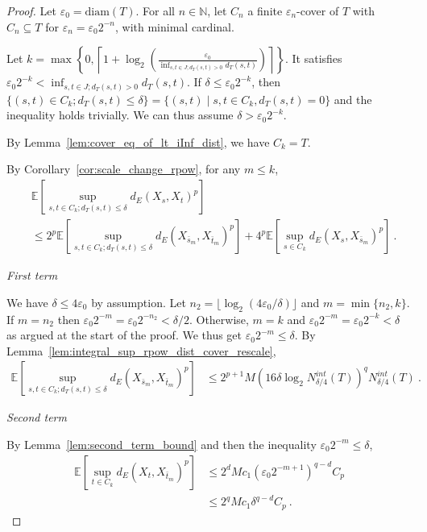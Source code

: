 \begin{proof}
Let $\varepsilon_0 = \mathrm{diam}(T)$.
For all $n \in \mathbb{N}$, let $C_n$ a finite $\varepsilon_n$-cover of $T$ with $C_n \subseteq T$ for $\varepsilon_n = \varepsilon_0 2^{-n}$, with minimal cardinal.

Let $k = \max \left\{ 0, \left\lceil 1 + \log_2\left(\frac{\varepsilon_0}{\inf_{s, t \in J; d_T(s,t)>0}d_T(s, t)}\right) \right\rceil \right\}$.
It satisfies $\varepsilon_0 2^{-k} < \inf_{s, t \in J; d_T(s,t)>0}d_T(s, t)$.
If $\delta \le \varepsilon_0 2^{-k}$, then $\{(s, t) \in C_k; d_T(s, t) \le \delta\} = \{(s, t) \mid s,t \in C_k, d_T(s,t) = 0\}$ and the inequality holds trivially.
We can thus assume $\delta > \varepsilon_0 2^{-k}$.

By Lemma~\ref{lem:cover_eq_of_lt_iInf_dist}, we have $C_k = T$.

By Corollary~\ref{cor:scale_change_rpow}, for any $m \le k$,
\begin{align*}
  &\mathbb{E}\left[ \sup_{s, t \in C_k; d_T(s, t) \le \delta} d_E(X_s, X_t)^p \right]
  \\
  &\le 2^p \mathbb{E}\left[ \sup_{s, t \in C_k; d_T(s, t) \le \delta} d_E(X_{\bar{s}_m}, X_{\bar{t}_m})^p \right]
    + 4^p \mathbb{E}\left[ \sup_{s \in C_k} d_E(X_s, X_{\bar{s}_m})^p \right]
  \: .
\end{align*}

\emph{First term}

We have $\delta \le 4\varepsilon_0$ by assumption.
Let $n_2 = \lfloor \log_2(4\varepsilon_0/\delta) \rfloor$ and $m = \min\{n_2, k\}$.
If $m = n_2$ then $\varepsilon_0 2^{-m} = \varepsilon_0 2^{-n_2} < \delta/2$.
Otherwise, $m = k$ and $\varepsilon_0 2^{-m} = \varepsilon_0 2^{-k} < \delta$ as argued at the start of the proof.
We thus get $\varepsilon_0 2^{-m} \le \delta$.
By Lemma~\ref{lem:integral_sup_rpow_dist_cover_rescale},
\begin{align*}
  \mathbb{E} \left[ \sup_{s, t \in C_k; d_T(s, t) \le \delta} d_E(X_{\bar{s}_m}, X_{\bar{t}_m})^p \right]
  &\le 2^{p+1} M \left(16 \delta \log_2 N^{int}_{\delta/4}(T) \right)^q  N^{int}_{\delta/4}(T)
  \: .
\end{align*}

\emph{Second term}

By Lemma~\ref{lem:second_term_bound} and then the inequality $\varepsilon_0 2^{-m} \le \delta$,
\begin{align*}
  \mathbb{E} \left[\sup_{t \in C_k} d_E(X_t, X_{\bar{t}_m})^p \right]
  &\le 2^d M c_1 (\varepsilon_0 2^{-m+1})^{q - d} C_p
  \\
  &\le 2^q M c_1 \delta^{q - d} C_p
  \: .
\end{align*}


\end{proof}
